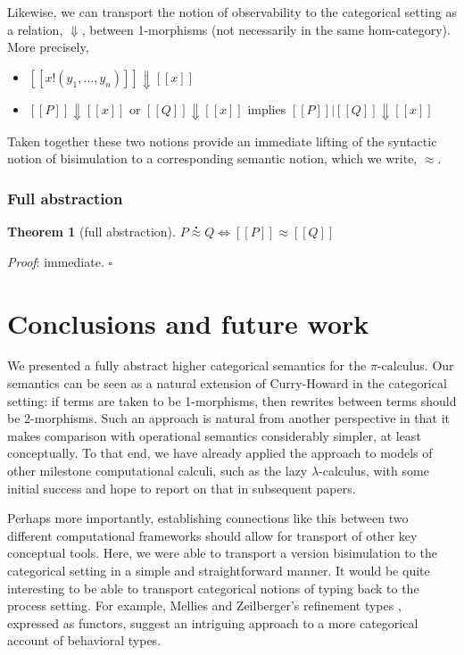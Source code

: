 \documentclass[]{acm_proc_article-sp}
\newcommand{\ldb}{[\![}
\newcommand{\rdb}{]\!]}
\newcommand{\id}[1]{\texttt{#1}}
\newcommand{\juxtap}{\mathbin{\id{|}}}
\newcommand{\meaningof}[1]{\ldb #1 \rdb}
\newcommand{\wbbisim}{\stackrel{\centerdot}{\approx}} %
\newcommand{\wbbisimsem}{\approx} %
\newtheorem{thm}{Theorem}[subsection]
\numberwithin{equation}{subsection}
\newcommand{\pic}{$\pi$-calculus}
\begin{document}
Likewise, we can transport the notion of observability to the
categorical setting as a relation, $\Downarrow$, between 1-morphisms (not necessarily
in the same hom-category). More precisely,

\begin{itemize}
  \item $\meaningof{x!(y_1,\ldots,y_n)} \Downarrow \meaningof{x}$
  \item $\meaningof{P} \Downarrow \meaningof{x}$ or $\meaningof{Q} \Downarrow \meaningof{x}$ implies $\meaningof{P} \juxtap \meaningof{Q} \Downarrow \meaningof{x}$
\end{itemize}

Taken together these two notions provide an immediate lifting of the syntactic
notion of bisimulation to a corresponding semantic notion, which we write, $\wbbisimsem$.

\subsubsection{Full abstraction}

\begin{thm}[full abstraction]
  $P \wbbisim Q \iff \meaningof{P} \wbbisimsem \meaningof{Q}$     
\end{thm}

\emph{Proof}: immediate. \hfill $\square$

\section{Conclusions and future work}
We presented a fully abstract higher categorical semantics for the
{\pic}. Our semantics can be seen as a natural extension of
Curry-Howard in the categorical setting: if terms are taken to be
1-morphisms, then rewrites between terms should be 2-morphisms. Such
an approach is natural from another perspective in that it makes
comparison with operational semantics considerably simpler, at least
conceptually. To that end, we have already applied the approach to
models of other milestone computational calculi, such as the lazy
$\lambda$-calculus, with some initial success and hope to report on
that in subsequent papers. 

Perhaps more importantly, establishing connections like this between
two different computational frameworks should allow for transport of
other key conceptual tools. Here, we were able to transport a version
bisimulation to the categorical setting in a simple and
straightforward manner. It would be quite interesting to be able to
transport categorical notions of typing back to the process
setting. For example, Mellies and Zeilberger's refinement types
\cite{DBLP:conf/popl/MelliesZ15}, expressed as functors, suggest an
intriguing approach to a more categorical account of behavioral types.
\end{document}
